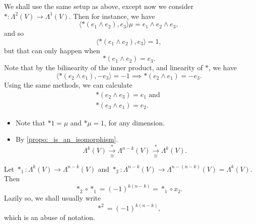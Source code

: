\documentclass[notoc,notitlepage]{tufte-book}
\begin{document}
\begin{eg}
  We shall use the same setup as above, except now we consider $* : \Lambda^2(V)
  \to \Lambda^1(V)$. Then for instance, we have
  \begin{equation*}
    \langle *(e_1 \land e_2) , e_3 \rangle \mu = e_1 \land e_2 \land e_3,
  \end{equation*}
  and so
  \begin{equation*}
    \langle *(e_1 \land e_2), e_3 \rangle = 1,
  \end{equation*}
  but that can only happen when
  \begin{equation*}
    *(e_1 \land e_2) = e_3.
  \end{equation*}
  Note that by the bilinearity of the inner product, and linearity of $*$, we
  have
  \begin{equation*}
    \langle *(e_2 \land e_1), -e_3 \rangle = -1 \implies *(e_2 \land e_1) = -
    e_3.
  \end{equation*}
  Using the same methods, we can calculate
  \begin{gather*}
    *(e_2 \land e_3) = e_1 \text{ and } \\
    *(e_3 \land e_1) = e_2.
  \end{gather*}
\end{eg}

\begin{note}
  \begin{itemize}
    \item Note that $* 1 = \mu$ and  $* \mu = 1$, for any dimension.
    \item By \cref{propo:_is_an_isomorphism}.
      \begin{equation*}
        \Lambda^k(V) \overset{*}{\underset{\cong}{\to}} \Lambda^{n-k} (V)
        \overset{*}{\underset{\cong}{\to}} \Lambda^k(V).
      \end{equation*}
  \end{itemize}
\end{note}

\begin{propo}[$*^2 = (-1)^{k(n-k)}$]\label{propo:star_2_1_k_n_k_}
  Let $*_1 : \Lambda^k(V) \to \Lambda^{n-k}(V)$ and $*_2 : \Lambda^{n-k}(V) \to
  \Lambda^{n - (n - k)}(V) = \Lambda^{k}(V)$. Then
  \begin{equation*}
    *_2 \circ *_1 = (-1)^{k(n-k)} = *_1 \circ x_2.
  \end{equation*}
  Lazily so, we shall usually write
  \begin{equation*}
    *^2 = (-1)^{k(n-k)},
  \end{equation*}
  which is an abuse of notation.
\end{propo}
\end{document}
